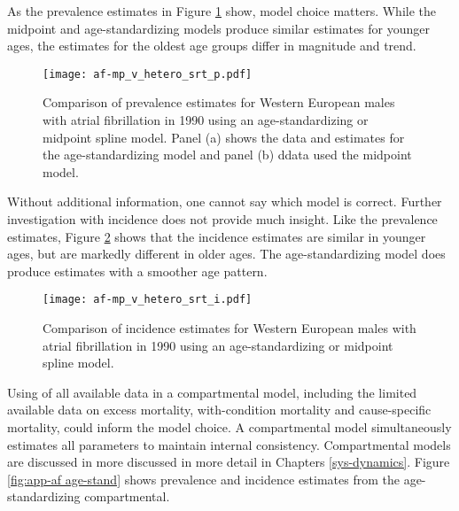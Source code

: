 As the prevalence estimates in Figure \ref{fig:app-af srt p} show, model
choice matters.  While the midpoint and age-standardizing models produce
similar estimates for younger ages, the estimates for the oldest age groups
differ in magnitude and trend.

    \begin{figure}[h]
        \begin{center}
            \texttt{[image: af-mp\_v\_hetero\_srt\_p.pdf]}
            \caption{Comparison of prevalence estimates for Western European
              males with atrial fibrillation in 1990 using an age-standardizing
              or midpoint spline model.  Panel (a) shows the data and 
              estimates for the age-standardizing model and panel (b)
              ddata used the midpoint model.}
            \label{fig:app-af srt p}
        \end{center}
    \end{figure}

Without additional information, one cannot say which model is correct.
Further investigation with incidence does not provide much insight.  Like
the prevalence estimates, Figure \ref{fig:app-af srt i} shows that the
incidence estimates are similar in younger ages, but are markedly different
in older ages.  The age-standardizing model does produce estimates with a
smoother age pattern.

    \begin{figure}[h]
        \begin{center}
            \texttt{[image: af-mp\_v\_hetero\_srt\_i.pdf]}
            \caption{Comparison of incidence estimates for Western European
              males with atrial fibrillation in 1990 using an age-standardizing
              or midpoint spline model.}
            \label{fig:app-af srt i}
        \end{center}
    \end{figure}
    
Using of all available data in a compartmental model, including the 
limited available data on excess mortality, with-condition mortality 
and cause-specific mortality, could inform the model choice.  
A compartmental model simultaneously estimates all parameters to 
maintain internal consistency.  Compartmental models are discussed 
in more discussed in more detail in Chapters \ref{sys-dynamics}.  
Figure \ref{fig:app-af age-stand} shows prevalence and incidence estimates 
from the age-standardizing compartmental.

